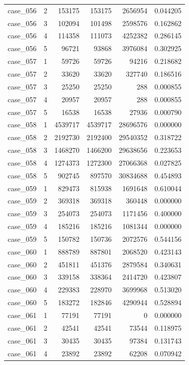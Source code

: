 \begin{longtable}{lrrrrr}
case\_056 & 2 & 153175 & 153175 & 2656954 & 0.044205 \\
case\_056 & 3 & 102094 & 101498 & 2598576 & 0.162862 \\
case\_056 & 4 & 114358 & 111073 & 4252382 & 0.286145 \\
case\_056 & 5 & 96721 & 93868 & 3976084 & 0.302925 \\
case\_057 & 1 & 59726 & 59726 & 94216 & 0.218682 \\
case\_057 & 2 & 33620 & 33620 & 327740 & 0.186516 \\
case\_057 & 3 & 25250 & 25250 & 288 & 0.000855 \\
case\_057 & 4 & 20957 & 20957 & 288 & 0.000855 \\
case\_057 & 5 & 16538 & 16538 & 27936 & 0.000790 \\
case\_058 & 1 & 4539717 & 4539717 & 28696576 & 0.000000 \\
case\_058 & 2 & 2192730 & 2192400 & 29540352 & 0.318722 \\
case\_058 & 3 & 1468270 & 1466200 & 29638656 & 0.223653 \\
case\_058 & 4 & 1274373 & 1272300 & 27066368 & 0.027825 \\
case\_058 & 5 & 902745 & 897570 & 30834688 & 0.454893 \\
case\_059 & 1 & 829473 & 815938 & 1691648 & 0.610044 \\
case\_059 & 2 & 369318 & 369318 & 360448 & 0.000000 \\
case\_059 & 3 & 254073 & 254073 & 1171456 & 0.400000 \\
case\_059 & 4 & 185216 & 185216 & 1081344 & 0.000000 \\
case\_059 & 5 & 150782 & 150736 & 2072576 & 0.544156 \\
case\_060 & 1 & 888789 & 887801 & 2068520 & 0.423143 \\
case\_060 & 2 & 451811 & 451376 & 2879584 & 0.340631 \\
case\_060 & 3 & 339158 & 338364 & 2414720 & 0.423807 \\
case\_060 & 4 & 229383 & 228970 & 3699968 & 0.513020 \\
case\_060 & 5 & 183272 & 182846 & 4290944 & 0.528894 \\
case\_061 & 1 & 77191 & 77191 & 0 & 0.000000 \\
case\_061 & 2 & 42541 & 42541 & 73544 & 0.118975 \\
case\_061 & 3 & 30435 & 30435 & 97384 & 0.131743 \\
case\_061 & 4 & 23892 & 23892 & 62208 & 0.070942 \\

\end{longtable}
